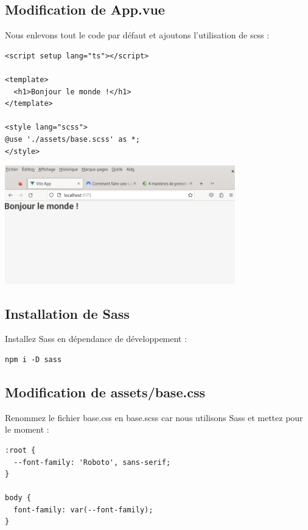 \subsection{Modification de {\color{monOrange}App.vue}}
Nous enlevons tout le code par défaut et ajoutons l'utilisation de {\color{monOrange}scss} :
\begin{verbatim}
<script setup lang="ts"></script>

<template>
  <h1>Bonjour le monde !</h1>
</template>

<style lang="scss">
@use './assets/base.scss' as *;
</style>
\end{verbatim}
\begin{center}
\includegraphics[width=10cm]{images/image14.png}
\end{center}
\subsection{Installation de {\color{monOrange}Sass}}
Installez Sass en dépendance de développement :
\begin{verbatim}
npm i -D sass
\end{verbatim}

\subsection{Modification de {\color{monOrange}assets/base.css}}
Renommez le fichier {\color{monOrange}base.css} en {\color{monOrange}base.scss} car nous utilisons {\color{monOrange}Sass} et mettez pour le moment :
\begin{verbatim}
:root {
  --font-family: 'Roboto', sans-serif;
}

body {
  font-family: var(--font-family);
}
\end{verbatim}

